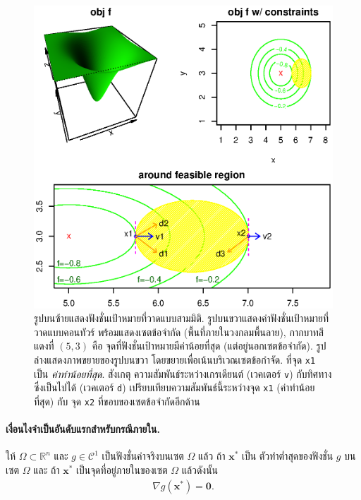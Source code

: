 %
\begin{figure}
\begin{center}
\includegraphics[width=6.0in]
{02Background/FONC.eps}
\end{center}
\caption{รูปบนซ้ายแสดงฟังชั่นเป้าหมายที่วาดแบบสามมิติ.
รูปบนขวาแสดงค่าฟังชั่นเป้าหมายที่วาดแบบคอนทัวร์ พร้อมแสดงเซตข้อจำกัด (พื้นที่ภายในวงกลมพื้นลาย), กากบาทสีแดงที่ $(5,3)$ คือ จุดที่ฟังชั่นเป้าหมายมีค่าน้อยที่สุด (แต่อยู่นอกเซตข้อจำกัด).
รูปล่างแสดงภาพขยายของรูปบนขวา โดยขยายเพื่อเน้นบริเวณเซตข้อกำจัด.
ที่จุด \texttt{x1} เป็น \textit{ค่าทำน้อยที่สุด}.
สังเกตุ ความสัมพันธ์ระหว่างเกรเดียนต์ (เวคเตอร์ \texttt{v}) กับทิศทางซึ่งเป็นไปได้ (เวคเตอร์ \texttt{d}) เปรียบเทียบความสัมพันธ์นี้ระหว่างจุด \texttt{x1} (ค่าทำน้อยที่สุด) กับ จุด \texttt{x2} ที่ขอบของเซตข้อจำกัดอีกด้าน}
\label{fig: FONC}
\end{figure}
%

\paragraph{เงื่อนไงจำเป็นอันดับแรกสำหรับกรณีภายใน.} 
ให้ $\Omega \subset \mathbb{R}^n$ และ $g \in \mathcal{C}^1$ เป็นฟังชั่นค่าจริงบนเซต $\Omega$ แล้ว
ถ้า $\mathbf{x}^*$ เป็น ตัวทำต่ำสุดของฟังชั่น $g$ บนเซต $\Omega$ และ ถ้า $\mathbf{x}^*$ เป็นจุดที่อยู่ภายในของเซต $\Omega$
แล้วดังนั้น
\begin{eqnarray}
   \nabla g(\mathbf{x}^*) = \mathbf{0}.
\label{eq: FONC interior case}
\end{eqnarray}

